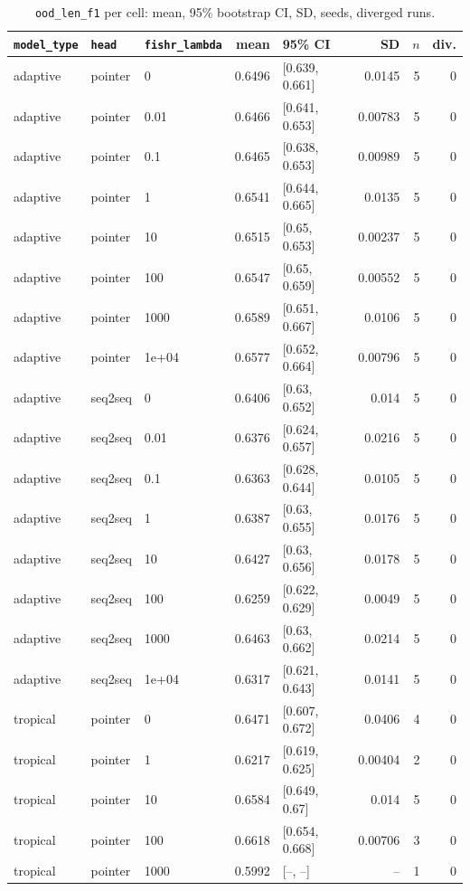 \documentclass[10pt]{article}
\begin{document}
{\small
\begin{longtable}{lllrlrrr}
\caption{\texttt{ood\_len\_f1} per cell: mean, 95\% bootstrap CI, SD, seeds, diverged runs.}\label{tab:summary-ood_len_f1}\\
\toprule
\texttt{model\_type} & \texttt{head} & \texttt{fishr\_lambda} & mean & 95\% CI & SD & $n$ & div.\\
\midrule
\endhead
adaptive & pointer & 0 & 0.6496 & [0.639, 0.661] & 0.0145 & 5 & 0\\
adaptive & pointer & 0.01 & 0.6466 & [0.641, 0.653] & 0.00783 & 5 & 0\\
adaptive & pointer & 0.1 & 0.6465 & [0.638, 0.653] & 0.00989 & 5 & 0\\
adaptive & pointer & 1 & 0.6541 & [0.644, 0.665] & 0.0135 & 5 & 0\\
adaptive & pointer & 10 & 0.6515 & [0.65, 0.653] & 0.00237 & 5 & 0\\
adaptive & pointer & 100 & 0.6547 & [0.65, 0.659] & 0.00552 & 5 & 0\\
adaptive & pointer & 1000 & 0.6589 & [0.651, 0.667] & 0.0106 & 5 & 0\\
adaptive & pointer & 1e+04 & 0.6577 & [0.652, 0.664] & 0.00796 & 5 & 0\\
adaptive & seq2seq & 0 & 0.6406 & [0.63, 0.652] & 0.014 & 5 & 0\\
adaptive & seq2seq & 0.01 & 0.6376 & [0.624, 0.657] & 0.0216 & 5 & 0\\
adaptive & seq2seq & 0.1 & 0.6363 & [0.628, 0.644] & 0.0105 & 5 & 0\\
adaptive & seq2seq & 1 & 0.6387 & [0.63, 0.655] & 0.0176 & 5 & 0\\
adaptive & seq2seq & 10 & 0.6427 & [0.63, 0.656] & 0.0178 & 5 & 0\\
adaptive & seq2seq & 100 & 0.6259 & [0.622, 0.629] & 0.0049 & 5 & 0\\
adaptive & seq2seq & 1000 & 0.6463 & [0.63, 0.662] & 0.0214 & 5 & 0\\
adaptive & seq2seq & 1e+04 & 0.6317 & [0.621, 0.643] & 0.0141 & 5 & 0\\
tropical & pointer & 0 & 0.6471 & [0.607, 0.672] & 0.0406 & 4 & 0\\
tropical & pointer & 1 & 0.6217 & [0.619, 0.625] & 0.00404 & 2 & 0\\
tropical & pointer & 10 & 0.6584 & [0.649, 0.67] & 0.014 & 5 & 0\\
tropical & pointer & 100 & 0.6618 & [0.654, 0.668] & 0.00706 & 3 & 0\\
tropical & pointer & 1000 & 0.5992 & [--, --] & -- & 1 & 0\\

\end{longtable}}
\end{document}
